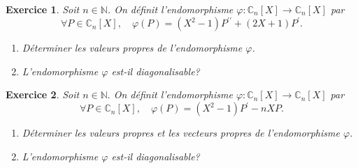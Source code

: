 \documentclass[12pt,a4paper]{article}
\theoremstyle{break}
\theoremstyle{break}
\newtheorem{Exo}{Exercice}
\begin{document}
\begin{Exo}
Soit $n \in \mathbb{N}$. On définit l'endomorphisme $\varphi: \mathbb{C}_{n}[X] \rightarrow \mathbb{C}_{n}[X]$ par
	$$
	\forall P \in \mathbb{C}_{n}[X], \quad \varphi(P)=\left(X^{2}-1\right) P^{\prime \prime}+(2 X+1) P^{\prime} .
	$$
	\begin{enumerate}
		\item
		Déterminer les valeurs propres de l'endomorphisme $\varphi$.
		\item
		L'endomorphisme $\varphi$ est-il diagonalisable?
	\end{enumerate}
\end{Exo}

\begin{Exo}
Soit $n \in \mathbb{N} .$ On définit l'endomorphisme $\varphi: \mathbb{C}_{n}[X] \rightarrow \mathbb{C}_{n}[X]$ par
	$$
	\forall P \in \mathbb{C}_{n}[X], \quad \varphi(P)=\left(X^{2}-1\right) P^{\prime}-n X P .
	$$
	\begin{enumerate}
		\item
			Déterminer les valeurs propres et les vecteurs propres de l'endomorphisme $\varphi$.
			\item
			 L'endomorphisme $\varphi$ est-il diagonalisable?
	\end{enumerate}
\end{Exo}
\end{document}

